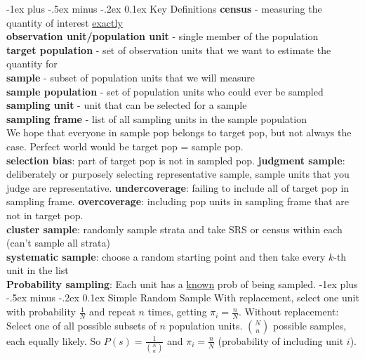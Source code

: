 \documentclass[landscape]{article}
\makeatletter
\renewcommand{\section}{\@startsection{section}{1}{0mm}%
                                {-1ex plus -.5ex minus -.2ex}%
                                {0.1ex}%
                                {\color{blue}\normalfont\large\bfseries}}
\makeatother
\begin{document}
\begin{multicols*}{3}
\section{Key Definitions}
\textbf{census} - measuring the quantity of interest
\underline{exactly}
\\ \textbf{observation unit/population unit} - single member of the
population
\\ \textbf{target population} - set of observation units that we want
to estimate the quantity for
\\ \textbf{sample} - subset of population units that we will measure
\\ \textbf{sample population} - set of population units who could ever
be sampled
\\ \textbf{sampling unit} - unit that can be selected for a sample
\\ \textbf{sampling frame} - list of all sampling units in the sample population
\\ We hope that everyone in sample pop belongs to target pop, but not
always the case. Perfect world would be target pop = sample pop.
\\ \textbf{selection bias}: part of target pop is not in sampled
pop. \textbf{judgment sample}: deliberately or purposely selecting
representative sample, sample units that you judge are
representative. \textbf{undercoverage}: failing to include all of
target pop in sampling frame. \textbf{overcoverage}: including pop
units in sampling frame that are not in target pop.
\\ \textbf{cluster sample}: randomly sample strata and take SRS or
census within each (can't sample all strata)
\\ \textbf{systematic sample}: choose a random starting point and then
take every $k$-th unit in the list
\\ \textbf{Probability sampling}: Each unit has a \underline{known}
prob of being sampled.
\section{Simple Random Sample} With replacement, select one unit with
probability $\frac{1}{N}$ and repeat $n$ times, getting $\pi_i =
\frac{n}{N}$. Without replacement:
Select one of all possible subsets of
$n$ population units. $\binom{N}{n}$ possible samples, each equally
likely. So $P(s) = \frac{1}{\binom{N}{n}}$ and $\pi_i = \frac{n}{N}$
(probability of including unit $i$).

\end{multicols*}
\end{document}
